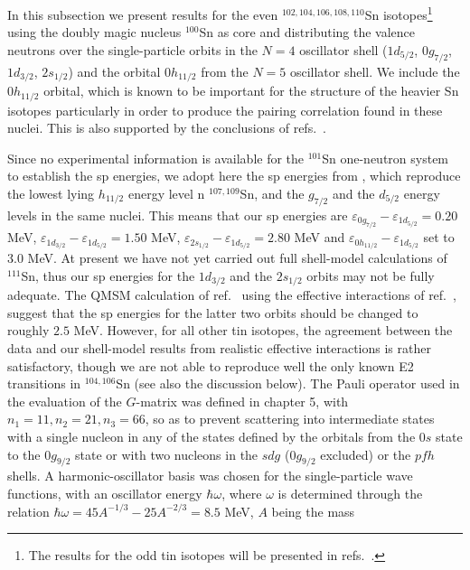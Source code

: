 In this subsection we present results for
the even  $^{102, 104, 106, 108, 110}$Sn isotopes\footnote{The results
for the odd tin isotopes will be presented
in refs.\ \cite{physcripta94,nicuoslo94}.} using the doubly magic
nucleus $^{100}$Sn as
core and distributing the valence neutrons over
the single-particle orbits in
the $N = 4$ oscillator shell
($1d_{5/2}$, $0g_{7/2}$, $1d_{3/2}$, $2s_{1/2}$)
and the orbital $0h_{11/2}$ from the $N = 5$ oscillator shell.
We include the  $0h_{11/2}$ orbital, which is known to
be important for the structure of the heavier Sn isotopes \cite{bon84}
particularly in order to produce the pairing correlation found in these
nuclei. This is also supported by the conclusions of refs.\
\cite{ehho93,holt94,physcripta94,nicu94,nicuoslo94}.


Since
no experimental information is available for the $^{101}$Sn
one-neutron system
to establish the sp energies,
we adopt here the sp energies from \cite{nicuoslo94},
which reproduce the lowest lying
$h_{11/2}$ energy level n $^{107,109}$Sn, and the $g_{7/2}$
and the $d_{5/2}$ energy levels in the same nuclei. This means
that our sp energies are
$\varepsilon_{0g_{7/2}}-\varepsilon_{1d_{5/2}} =0.20$ MeV,
$\varepsilon_{1d_{3/2}}-\varepsilon_{1d_{5/2}} =1.50$ MeV,
$\varepsilon_{2s_{1/2}}-\varepsilon_{1d_{5/2}} =2.80$ MeV and
$\varepsilon_{0h_{11/2}}-\varepsilon_{1d_{5/2}}$ set to 3.0 MeV.
At present we have not yet carried out full shell-model calculations
of $^{111}$Sn, thus our sp energies for the $1d_{3/2}$ and the
$2s_{1/2}$ orbits may not be fully adequate.
The QMSM calculation of ref.\ \cite{nicuoslo94}
using the effective interactions of ref.\ \cite{ehho93}, 
suggest that the sp energies for the
latter two orbits should be changed to roughly $2.5$ MeV.
However, for all other
tin isotopes, the agreement between the data  and our shell-model
results from realistic effective
interactions is rather satisfactory, though we
are not able to reproduce well the only known E2 transitions in
$^{104,106}$Sn (see also the discussion below).
The Pauli operator used in the evaluation of the $G$-matrix
was defined in chapter 5, with $n_1=11, n_2=21, n_3=66$, so as to
prevent scattering into intermediate states with a single
nucleon in any of the
states defined by the orbitals from the $0s$ state to the $0g_{9/2}$ state
or with two nucleons in the $sdg$ ($0g_{9/2}$ excluded) or the $pfh$
shells. A harmonic-oscillator basis was chosen for the
single-particle wave functions, with an oscillator energy $\hbar\omega$,
where $\omega$  is determined through the relation
$\hbar\omega = 45A^{-1/3} - 25A^{-2/3}= 8.5$ MeV,  $A$ being the mass
